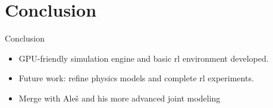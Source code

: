 \documentclass[12pt]{beamer}
\begin{document}
\section{Conclusion}
\begin{frame}{Conclusion}
    \begin{itemize}
        \item GPU-friendly simulation engine and basic rl environment developed.
        \item Future work: refine physics models and complete rl experiments.
        \item Merge with Aleš and his more advanced joint modeling
    \end{itemize}
\end{frame}
\end{document}
